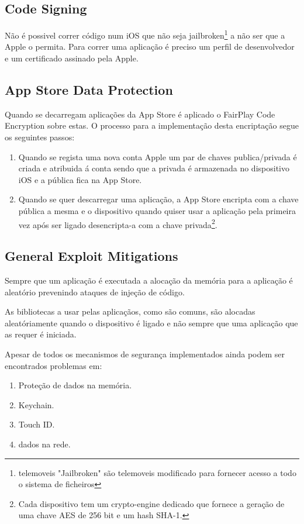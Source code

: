 \subsection{ Code Signing}
\hfill\par
	Não é possivel correr código num iOS que não seja jailbroken\footnote[3]{telemoveis "Jailbroken" são telemoveis modificado para fornecer acesso a todo o sistema de ficheiros\cite{ref_intro2}} a não ser que a Apple o permita. Para correr uma aplicação é preciso um perfil de desenvolvedor e um certificado assinado pela Apple.


\subsection{ App Store Data Protection}
\hfill\par
	Quando se decarregam aplicações da App Store é aplicado o FairPlay Code Encryption sobre estas. O processo para a implementação desta encriptação segue os seguintes passos:\par
	\begin{enumerate}
	\item Quando se regista uma nova conta Apple um par de chaves publica/privada é criada e atribuida á conta sendo que a privada é armazenada no dispositivo iOS e a pública fica na App Store.\par
	\item Quando se quer descarregar uma aplicação, a App Store encripta com a chave pública a mesma e o dispositivo quando quiser usar a aplicação pela primeira vez após ser ligado desencripta-a com a chave privada\footnote[3]{Cada dispositivo tem um crypto-engine dedicado que fornece a geração de uma chave AES de 256 bit e um hash SHA-1.}.\par
\end{enumerate}

\subsection{ General Exploit Mitigations}
\hfill\par
	Sempre que um aplicação é executada a alocação da memória para a aplicação é aleatório prevenindo ataques de injeção de código.\par
	As bibliotecas a usar pelas aplicaçãos, como são comuns, são alocadas aleatóriamente quando o dispositivo é ligado e não sempre que uma aplicação que as requer é iniciada.\par
\hfill\par
\hfill\par
Apesar de todos os mecanismos de segurança implementados ainda podem ser encontrados problemas em:
\renewcommand{\theenumi}{\Roman{enumi}}
\begin{enumerate}
	\item Proteção de dados na memória.
	\item Keychain.
	\item Touch ID.
	\item dados na rede.
\end{enumerate}
\renewcommand{\theenumi}{\arabic{enumi}}


